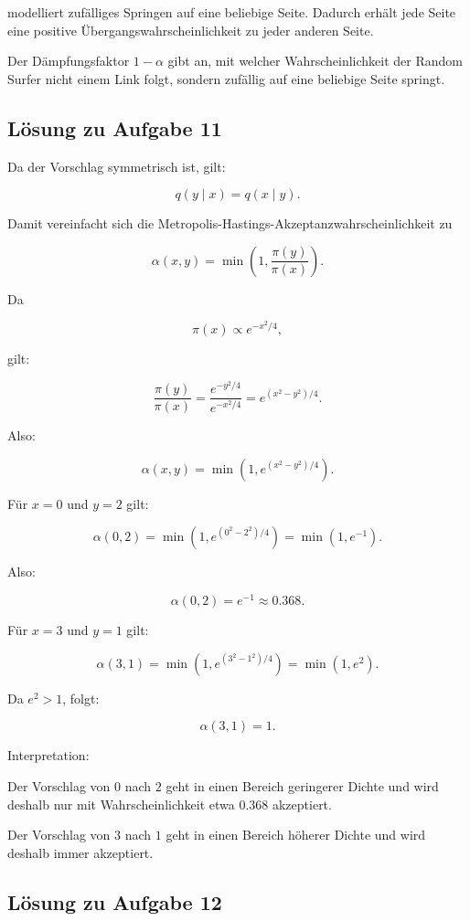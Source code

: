 \documentclass[11pt,a4paper]{article}
\begin{document}
modelliert zufälliges Springen auf eine beliebige Seite. Dadurch erhält jede Seite eine positive Übergangswahrscheinlichkeit zu jeder anderen Seite.

Der Dämpfungsfaktor $1-\alpha$ gibt an, mit welcher Wahrscheinlichkeit der Random Surfer nicht einem Link folgt, sondern zufällig auf eine beliebige Seite springt.

\subsection*{Lösung zu Aufgabe 11}

Da der Vorschlag symmetrisch ist, gilt:

\[
q(y\mid x)=q(x\mid y).
\]

Damit vereinfacht sich die Metropolis-Hastings-Akzeptanzwahrscheinlichkeit zu

\[
\alpha(x,y)
=
\min\left(1,\frac{\pi(y)}{\pi(x)}\right).
\]

Da

\[
\pi(x)\propto e^{-x^2/4},
\]

gilt:

\[
\frac{\pi(y)}{\pi(x)}
=
\frac{e^{-y^2/4}}{e^{-x^2/4}}
=
e^{(x^2-y^2)/4}.
\]

Also:

\[
\boxed{
\alpha(x,y)
=
\min\left(1,e^{(x^2-y^2)/4}\right)
}.
\]

Für $x=0$ und $y=2$ gilt:

\[
\alpha(0,2)
=
\min\left(1,e^{(0^2-2^2)/4}\right)
=
\min(1,e^{-1}).
\]

Also:

\[
\alpha(0,2)=e^{-1}\approx 0.368.
\]

Für $x=3$ und $y=1$ gilt:

\[
\alpha(3,1)
=
\min\left(1,e^{(3^2-1^2)/4}\right)
=
\min(1,e^2).
\]

Da $e^2>1$, folgt:

\[
\alpha(3,1)=1.
\]

Interpretation:

Der Vorschlag von $0$ nach $2$ geht in einen Bereich geringerer Dichte und wird deshalb nur mit Wahrscheinlichkeit etwa $0.368$ akzeptiert.

Der Vorschlag von $3$ nach $1$ geht in einen Bereich höherer Dichte und wird deshalb immer akzeptiert.

\subsection*{Lösung zu Aufgabe 12}
\end{document}
